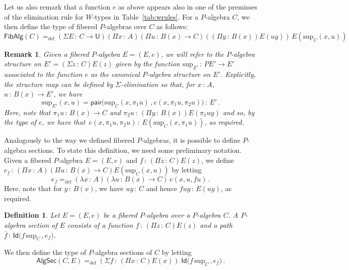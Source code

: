 \documentclass[10pt,a4paper,oneside,reqno]{amsart}
\numberwithin{equation}{section}
\theoremstyle{mythm}
\theoremstyle{mydef}
\newtheorem{definition}[theorem]{Definition}
\theoremstyle{myrmk}
\newtheorem{remark}[theorem]{Remark}
\newcommand{\defeq}{=_{\mathrm{def}}}
\newcommand{\co}{\,{:}\,}
\newcommand{\Id}{\mathsf{Id}}
\newcommand{\pair}{\mathsf{pair}}
\newcommand{\U}{\mathsf{U}}
\renewcommand{\sup}{\mathrm{sup}}
\newcommand{\FibPalg}{\mathsf{FibAlg}}
\newcommand{\PalgSec}{\mathsf{AlgSec}}
\begin{document}
Let us also remark that a function $e$ as above appears also in one of the premisses of the
elimination rule for $W$-types in Table~\ref{tab:wrules}. For a $P$-algebra $C$, we then define the type of fibered $P$-algebras 
over $C$ as follows:
\[
\FibPalg(C) \defeq (\Sigma E \co C \to \U) (\Pi x \co A) (\Pi u \co B(x) \to C) 
 ((\Pi y \co B(x)) E(u y))\,  E(\sup_C(x,u))
 \]
 
 \begin{remark} 
Given a fibered $P$-algebra $E = (E, e)$, we will refer to the $P$-algebra structure
on $E' = (\Sigma z \co C) E(z)$ given by the function $\sup_{E'} \co PE' \to E'$ associated to 
the function $e$ as the canonical $P$-algebra structure on $E'$. Explicitly, the structure
map can be defined by $\Sigma$-elimination so that, for $x \co A$, $u \co B(x) \to E'$, we have
\[
\sup_{E'}(x,u) = 
\pair \big( 
\sup_C(x, \pi_1 u ) \, , 
e( x, \pi_1 u, \pi_2 u) \big) \co E' \, .
\]
Here, note that $\pi_1 u \co B(x) \to C$ and $\pi_2 u \co (\Pi y \co B(x)) E(\pi_1 u y)$ and so,
by the type of $e$, we have that~$e(x, \pi_1 u, \pi_2 u) \co E( \sup_C(x, \pi_1 u))$, as required.
\end{remark} 

Analogously to the way we defined fibered $P$-algebras, it is possible to define 
$P$-algebra sections. To state this definition, we need some preliminary notation.
Given a fibered $P$-algebra $E = (E, e)$ and  $f \co (\Pi z \co C) E(z)$,
we define $e_f \co (\Pi x \co A)(\Pi u \co B(x) \to C) E(\sup_C(x,u))$ by letting
\begin{equation}
\label{equ:ef}
 e_f \defeq (\lambda x \co A)(\lambda u \co B(x) \to C) \, e(x, u, f u) \, .
\end{equation}
Here, note that for $y \co B(x)$, we have $u y \co C$ and hence $f u y \co E(uy)$,
as required.


\begin{definition} \label{def:fibalgsection} Let $E = (E, e)$ be a fibered $P$-algebra over a $P$-algebra $C$.  
A \emph{$P$-algebra section} of $E$ consists of a function $f \co (\Pi z \co C) E(z)$ and a path 
$\bar{f} \co  \Id \big( f \,  \sup_C \, , e_f \big)$.
\end{definition} 

\medskip

We then define the type of $P$-algebra sections of $C$ by letting
\[ 
\PalgSec(C,E)  \defeq (\Sigma f  \co (\Pi x \co C) E(x)) \; \Id \big( f \, \sup_C \, , e_f  \big) \, .
\]
\end{document}
